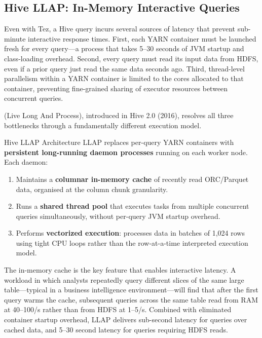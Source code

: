 \subsection{Hive LLAP: In-Memory Interactive Queries}
\label{subsec:llap}

Even with Tez, a Hive query incurs several sources of latency that prevent
sub-minute interactive response times. First, each YARN container must be
launched fresh for every query---a process that takes 5--30 seconds of
JVM startup and class-loading overhead. Second, every query must read its
input data from HDFS, even if a prior query just read the same data seconds
ago. Third, thread-level parallelism within a YARN container is limited
to the cores allocated to that container, preventing fine-grained sharing
of executor resources between concurrent queries.

 (Live Long And Process), introduced in Hive 2.0 (2016),
resolves all three bottlenecks through a fundamentally different execution
model.

\begin{defbox}{Hive LLAP Architecture}
LLAP replaces per-query YARN containers with \textbf{persistent long-running
daemon processes} running on each worker node. Each daemon:
\begin{enumerate}
  \item Maintains a \textbf{columnar in-memory cache} of recently read
        ORC/Parquet data, organised at the column chunk granularity.
  \item Runs a \textbf{shared thread pool} that executes tasks from
        multiple concurrent queries simultaneously, without per-query
        JVM startup overhead.
  \item Performs \textbf{vectorized execution}: processes data in batches
        of 1{,}024 rows using tight CPU loops rather than the
        row-at-a-time interpreted execution model.
\end{enumerate}
\end{defbox}

The in-memory cache is the key feature that enables interactive latency.
A workload in which analysts repeatedly query different slices of the
same large table---typical in a business intelligence environment---will
find that after the first query warms the cache, subsequent queries
across the same table read from RAM at 40--100\GB/s rather than from
HDFS at 1--5\GB/s. Combined with eliminated container startup overhead,
LLAP delivers sub-second latency for queries over cached data, and
5--30 second latency for queries requiring HDFS reads.

